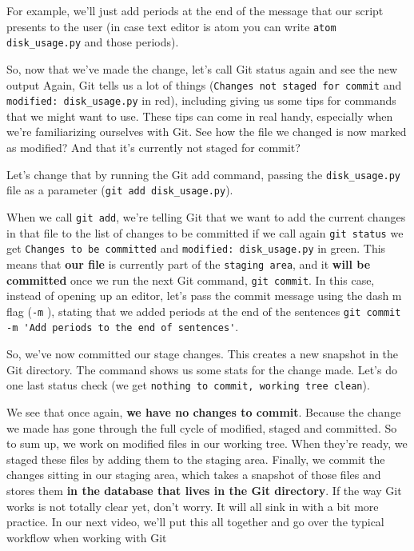 	For example, we'll just add periods at the end of the message that our script presents to the user (in case text editor is atom you can write \verb|atom disk_usage.py| and those periods).
	
	So, now that we've made the change, let's call Git status again and see the new output Again, Git tells us a lot of things (\texttt{Changes not staged for commit} and \verb|modified: disk_usage.py| in red),  including giving us some tips for commands that we might want to use. These tips can come in real handy, especially when we're familiarizing ourselves with Git. See how the file we changed is now marked as modified? And that it's currently not staged for commit?
	
	Let's change that by running the Git add command, passing the \verb|disk_usage.py| file as a parameter (\verb|git add disk_usage.py|).
	
	When we call \texttt{git add}, we're telling Git that we want to add the current changes in that file to the list of changes to be committed if we call again \texttt{git status} we get \texttt{Changes to be committed} and \verb|modified: disk_usage.py| in green. This means that \textbf{our file} is currently part of the \texttt{staging area}, and it \textbf{will be committed} once we run the next Git command, \texttt{git commit}. In this case, instead of opening up an editor, let's pass the commit message using the dash m flag (\verb|-m| ), stating that we added periods at the end of the sentences \texttt{git commit} \verb|-m 'Add periods to the end of sentences'|.
	
	So, we've now committed our stage changes. This creates a new snapshot in the Git directory. The command shows us some stats for the change made. Let's do one last status check (we get \texttt{nothing to commit, working tree clean}).
	
	We see that once again, \textbf{we have no changes to commit}. Because the change we made has gone through the full cycle of modified, staged and committed. So to sum up, we work on modified files in our working tree. When they're ready, we staged these files by adding them to the staging area. Finally, we commit the changes sitting in our staging area, which takes a snapshot of those files and stores them \textbf{in the database that lives in the Git directory}. If the way Git works is not totally clear yet, don't worry. It will all sink in with a bit more practice. In our next video, we'll put this all together and go over the typical workflow when working with Git
	
